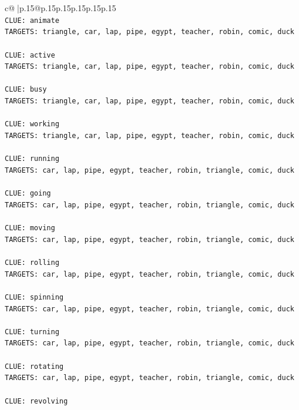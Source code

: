 \documentclass{article}
\begin{document}
{\begin{supertabular}{c@{$\;$}|p{.15\linewidth}@{}p{.15\linewidth}p{.15\linewidth}p{.15\linewidth}p{.15\linewidth}p{.15\linewidth}}
{{{\\ 
\texttt{CLUE: animate} \\
\texttt{TARGETS: triangle, car, lap, pipe, egypt, teacher, robin, comic, duck} \\
\\ 
\texttt{CLUE: active} \\
\texttt{TARGETS: triangle, car, lap, pipe, egypt, teacher, robin, comic, duck} \\
\\ 
\texttt{CLUE: busy} \\
\texttt{TARGETS: triangle, car, lap, pipe, egypt, teacher, robin, comic, duck} \\
\\ 
\texttt{CLUE: working} \\
\texttt{TARGETS: triangle, car, lap, pipe, egypt, teacher, robin, comic, duck} \\
\\ 
\texttt{CLUE: running} \\
\texttt{TARGETS: car, lap, pipe, egypt, teacher, robin, triangle, comic, duck} \\
\\ 
\texttt{CLUE: going} \\
\texttt{TARGETS: car, lap, pipe, egypt, teacher, robin, triangle, comic, duck} \\
\\ 
\texttt{CLUE: moving} \\
\texttt{TARGETS: car, lap, pipe, egypt, teacher, robin, triangle, comic, duck} \\
\\ 
\texttt{CLUE: rolling} \\
\texttt{TARGETS: car, lap, pipe, egypt, teacher, robin, triangle, comic, duck} \\
\\ 
\texttt{CLUE: spinning} \\
\texttt{TARGETS: car, lap, pipe, egypt, teacher, robin, triangle, comic, duck} \\
\\ 
\texttt{CLUE: turning} \\
\texttt{TARGETS: car, lap, pipe, egypt, teacher, robin, triangle, comic, duck} \\
\\ 
\texttt{CLUE: rotating} \\
\texttt{TARGETS: car, lap, pipe, egypt, teacher, robin, triangle, comic, duck} \\
\\ 
\texttt{CLUE: revolving} \\
}}}
\end{supertabular}}
\end{document}
